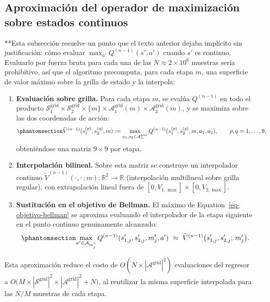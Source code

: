 \documentclass[
  letterpaper,
  DIV=11,
  numbers=noendperiod]{scrreprt}
\theoremstyle{definition}
\theoremstyle{remark}
\begin{document}
\subsection{Aproximación del operador de maximización sobre estados
continuos}\label{sec-max-operador}

**Esta subsección resuelve un punto que el texto anterior dejaba
implícito sin justificación: cómo evaluar \(\max_{a'}Q^{(n-1)}(s',a')\)
cuando \(s'\) es continuo. Evaluarlo por fuerza bruta para cada una de
las \(N\approx 2\times10^6\) muestras sería prohibitivo, así que el
algoritmo precomputa, para cada etapa \(m\), una superficie de valor
máximo sobre la grilla de estado y la interpola:

\begin{enumerate}
\def\labelenumi{\arabic{enumi}.}
\item
  \textbf{Evaluación sobre grilla.} Para cada etapa \(m\), se evalúa
  \(Q^{(n-1)}\) en todo el producto
  \(\mathcal S_1^{\text{grid}}\times\mathcal S_2^{\text{grid}}\times\{m\}\times\mathcal A_1^{\text{grid}}(m)\times\mathcal A_2^{\text{grid}}(m)\),
  y se maximiza sobre las dos coordenadas de acción:
  \begin{equation}\protect\phantomsection\label{eq-maxq-grilla}{
  \widehat V^{(n-1)}(s_1^{(p)},s_2^{(q)},m) := \max_{a_1,a_2\in\mathcal A_m^{\text{grid}}} Q^{(n-1)}(s_1^{(p)},s_2^{(q)},m,a_1,a_2), \qquad p,q=1,\dots,9,
  }\end{equation} obteniéndose una matriz \(9\times9\) por etapa.
\item
  \textbf{Interpolación bilineal.} Sobre esta matriz se construye un
  interpolador continuo
  \(\widetilde V^{(n-1)}(\cdot,\cdot\,;m):\mathbb R^2\to\mathbb R\)
  (interpolación multilineal sobre grilla regular), con extrapolación
  lineal fuera de \([0,V_{1,\max}]\times[0,V_{2,\max}]\).
\item
  \textbf{Sustitución en el objetivo de Bellman.} El máximo de
  Equation~\ref{eq-objetivo-bellman} se aproxima evaluando el
  interpolador de la etapa siguiente en el punto continuo genuinamente
  alcanzado:
  \begin{equation}\protect\phantomsection\label{eq-maxq-interp}{
  \max_{a'\in\mathcal A_{m_j'}} Q^{(n-1)}(s'_{1,j},s'_{2,j},m_j',a') \ \approx\ \widetilde V^{(n-1)}\big(s'_{1,j},s'_{2,j};\,m_j'\big).
  }\end{equation}
\end{enumerate}

Esta aproximación reduce el costo de
\(O(N\times|\mathcal A^{\text{grid}}|^2)\) evaluaciones del regresor a
\(O\big(M\times|\mathcal S^{\text{grid}}|^2\times|\mathcal A^{\text{grid}}|^2 + N\big)\),
al reutilizar la misma superficie interpolada para las \(N/M\) muestras
de cada etapa.
\end{document}
